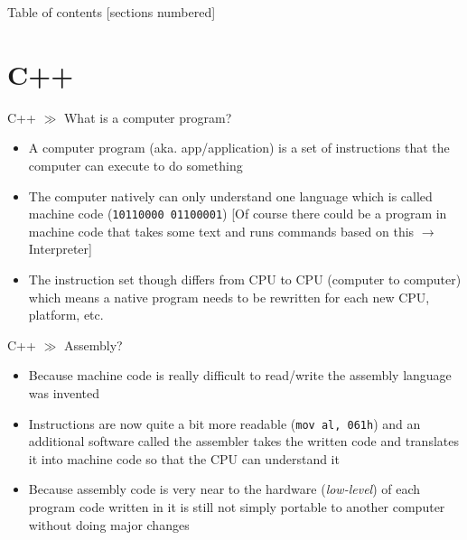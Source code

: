 \documentclass[10pt]{beamer}
\title{\mytitleTitle}
\subtitle{\mytitleSubtitle}
\date{\mydate}
\author{\myauthor}
\institute{Universit{\"a}t Stuttgart}
\begin{document}
\maketitle

\begin{frame}{Table of contents}
	[sections numbered]
	\tableofcontents[hideallsubsections]
\end{frame}

\section{C++}

\begin{frame}{C++ $\gg$ What is a computer program?}
\begin{itemize}
	\item A computer program (aka. app/application) is a set of instructions that the computer can execute to do something
	\item The computer natively can only understand one language which is called machine code (\texttt{10110000 01100001}) [Of course there could be a program in machine code that takes some text and runs commands based on this $\rightarrow$ Interpreter]
	\item The instruction set though differs from CPU to CPU (computer to computer) which means a native program needs to be rewritten for each new CPU, platform, etc.
\end{itemize}
\end{frame}

\begin{frame}{C++ $\gg$ Assembly?}
\begin{itemize}
	\item Because machine code is really difficult to read/write the assembly language was invented
	\item Instructions are now quite a bit more readable (\texttt{mov al, 061h}) and an additional software called the assembler takes the written code and translates it into machine code so that the CPU can understand it
	\item Because assembly code is very near to the hardware (\textit{low-level}) of each program code written in it is still not simply portable to another computer without doing major changes
\end{itemize}
\end{frame}
\end{document}
